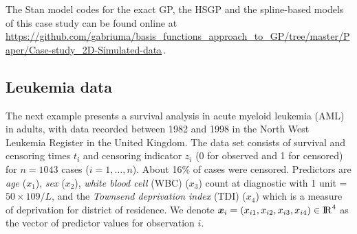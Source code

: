 %

The Stan model codes for the exact GP, the HSGP and the spline-based models of this case study can be found online at {\small \url{https://github.com/gabriuma/basis_functions_approach_to_GP/tree/master/Paper/Case-study_2D-Simulated-data}}\,.


\subsection{Leukemia data}\label{sec_bf_caseVI}

The next example presents a survival analysis in acute myeloid leukemia (AML) in adults, with data recorded between 1982 and 1998 in the North West Leukemia Register in the United Kingdom. The data set consists of survival and censoring times $t_i$ and censoring indicator $z_i$ (0 for observed and 1 for censored) for $n=1043$ cases ($i=1,\dots,n$). About 16\% of cases were censored. Predictors are \textit{age} ($x_1$), \textit{sex} ($x_2$), \textit{white blood cell} (WBC) ($x_3$) count at diagnostic with 1 unit = $50\times109/L$, and the \textit{Townsend deprivation index} (TDI) ($x_4$) which is a measure of deprivation for district of residence. We denote $\bm{x}_i=(x_{i1},x_{i2},x_{i3},x_{i4}) \in {\rm I\!R}^{4}$ as the vector of predictor values for observation $i$.

